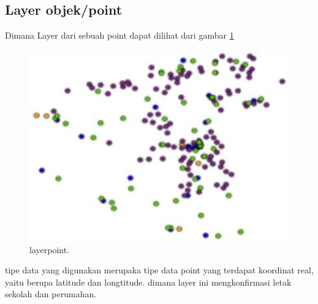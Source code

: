 \subsection{Layer objek/point}
Dimana Layer dari sebuah point dapat dilihat dari gambar \ref{layerpoint}
 \begin{figure}[ht]
	\centerline{\includegraphics[width=1\textwidth]{figures/layerpoint.JPG}}
	\caption{layerpoint.}
	\label{layerpoint}
	\end{figure}
tipe data yang digunakan merupaka tipe data point yang terdapat koordinat real, yaitu berupa latitude dan longtitude. dimana layer ini mengkonfirmasi letak sekolah dan perumahan.

